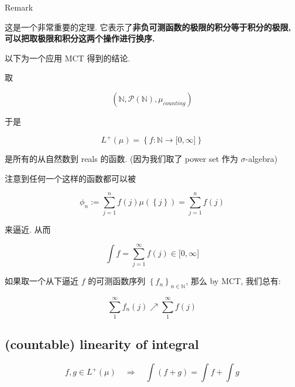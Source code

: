 \documentclass{qlnotes-export}
\begin{document}
\begin{qlremark}{Remark}

这是一个非常重要的定理. 它表示了\textbf{非负可测函数的极限的积分等于积分的极限, 可以把取极限和积分这两个操作进行换序.}

\end{qlremark}

以下为一个应用 MCT 得到的结论.

\begin{example}\label{ex-04-measurable-functions-and-integration-on-l-mu-example-002}

取

\[({\mathbb{N}},\mathcal{P}({\mathbb{N}}),\mu_{counting})\]

于是

\[L^{+}(\mu) = \left\{ {f:{\mathbb{N}}\rightarrow\lbrack 0,\infty\rbrack} \right\}\]

是所有的从自然数到 reals 的函数. (因为我们取了 power set 作为 \(\sigma\)-algebra)

注意到任何一个这样的函数都可以被

\[\phi_{n} := \sum\limits_{j = 1}^{n}f(j)\mu(\left\{ j \right\}) = \sum\limits_{j = 1}^{n}f(j)\]

来逼近. 从而

\[\int f = \sum\limits_{j = 1}^{\infty}f(j) \in \lbrack 0,\infty\rbrack\]

如果取一个从下逼近 \(f\) 的可测函数序列 \(\left\{ f_{n} \right\}_{n \in {\mathbb{N}}}\), 那么 by MCT, 我们总有:

\[\sum\limits_{1}^{\infty}f_{n}(j)\operatorname{\nearrow ︎}\sum\limits_{1}^{\infty}f(j)\]

\end{example}

\subsection{(countable) linearity of integral}\label{countable-linearity-of-integral}

\begin{corollary}\label{cor-04-measurable-functions-and-integration-on-l-mu-corollary-004}

\[f,g \in L^{+}(\mu)\quad\Rightarrow\quad\int(f + g) = \int f + \int g\]

\end{corollary}
\end{document}
